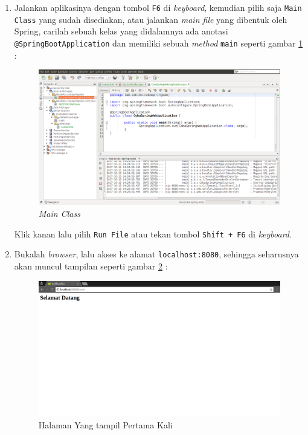 \begin{enumerate}
	\item Jalankan aplikasinya dengan tombol \texttt{F6} di \textit{keyboard}, kemudian pilih saja \texttt{Main Class} yang sudah disediakan, atau jalankan \textit{main file} yang dibentuk oleh Spring, carilah sebuah kelas yang didalamnya ada anotasi \texttt{@SpringBootApplication} dan memiliki sebuah \textit{method} \texttt{main} seperti gambar \ref{fig:main-class} :
	
	\begin{figure}[H]
		\centering
		\includegraphics[width=1\textwidth]{./resources/006-main-class}
		\caption{\textit{Main Class}}
		\label{fig:main-class}
	\end{figure}
	
	Klik kanan lalu pilih \texttt{Run File} atau tekan tombol \texttt{Shift + F6} di \textit{keyboard}.
	
	\item Bukalah \textit{browser}, lalu akses ke alamat \texttt{localhost:8080}, sehingga seharusnya akan muncul tampilan seperti gambar \ref{fig:localhost-1} :
	
	\begin{figure}[H]
		\centering
		\includegraphics[width=1\textwidth]{./resources/007-localhost-1}
		\caption{Halaman Yang tampil Pertama Kali}
		\label{fig:localhost-1}		
	\end{figure}
\end{enumerate}

